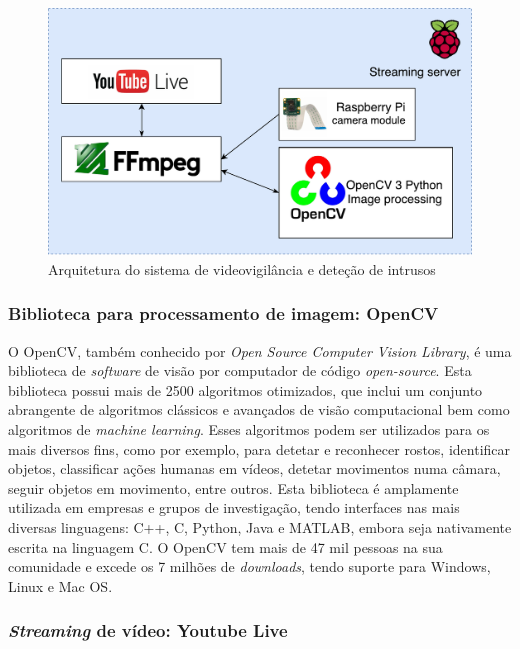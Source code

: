 \begin{figure}[h]
	\centering
	\includegraphics[scale = 0.39]{esquemas/videostream.pdf}
	\caption{Arquitetura do sistema de videovigilância e deteção de intrusos }
	\label{arquiteturavisao}
\end{figure}


\subsubsection{Biblioteca para processamento de imagem: OpenCV}

O OpenCV, também conhecido por \textit{Open Source Computer Vision Library}, é uma biblioteca de \textit{software} de visão por computador de código \textit{open-source}. Esta biblioteca possui mais de 2500 algoritmos otimizados, que inclui um conjunto abrangente de algoritmos clássicos e avançados de visão computacional bem como algoritmos de \textit{machine learning}. Esses algoritmos podem ser utilizados para os mais diversos fins, como por exemplo, para detetar e reconhecer rostos, identificar objetos, classificar ações humanas em vídeos, detetar movimentos numa câmara, seguir objetos em movimento, entre outros. Esta biblioteca é amplamente utilizada em empresas e grupos de investigação, tendo interfaces nas mais diversas linguagens: C++, C, Python, Java e MATLAB, embora seja nativamente escrita na linguagem C. O OpenCV tem mais de 47 mil pessoas na sua comunidade e excede os 7 milhões de \textit{downloads}, tendo suporte para Windows, Linux e Mac OS\cite{Itseez}.

\subsubsection{\textit{Streaming} de vídeo: Youtube Live}

